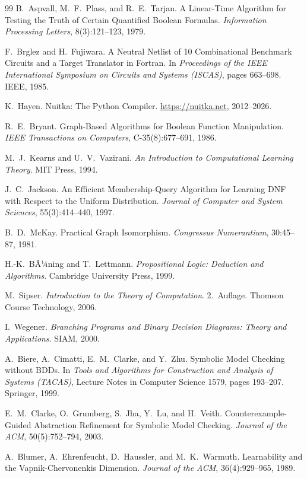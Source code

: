 ﻿\documentclass[a4paper,12pt]{article}
\theoremstyle{definition}
\begin{document}
\begin{thebibliography}{99}
B.\ Aspvall, M.\ F.\ Plass, and R.\ E.\ Tarjan. A Linear-Time Algorithm for Testing the Truth of Certain Quantified Boolean Formulas. \textit{Information Processing Letters}, 8(3):121--123, 1979.

F.\ Brglez and H.\ Fujiwara. A Neutral Netlist of 10 Combinational Benchmark Circuits and a Target Translator in Fortran. In \textit{Proceedings of the IEEE International Symposium on Circuits and Systems (ISCAS)}, pages 663--698. IEEE, 1985.

K.\ Hayen. Nuitka: The Python Compiler. \url{https://nuitka.net}, 2012--2026.

R.\ E.\ Bryant. Graph-Based Algorithms for Boolean Function Manipulation. \textit{IEEE Transactions on Computers}, C-35(8):677--691, 1986.

M.\ J.\ Kearns and U.\ V.\ Vazirani. \textit{An Introduction to Computational Learning Theory}. MIT Press, 1994.

J.\ C.\ Jackson. An Efficient Membership-Query Algorithm for Learning DNF with Respect to the Uniform Distribution. \textit{Journal of Computer and System Sciences}, 55(3):414--440, 1997.

B.\ D.\ McKay. Practical Graph Isomorphism. \textit{Congressus Numerantium}, 30:45--87, 1981.

H.-K.\ BÃ¼ning and T.\ Lettmann. \textit{Propositional Logic: Deduction and Algorithms}. Cambridge University Press, 1999.

M.\ Sipser. \textit{Introduction to the Theory of Computation}. 2.\ Auflage. Thomson Course Technology, 2006.

I.\ Wegener. \textit{Branching Programs and Binary Decision Diagrams: Theory and Applications}. SIAM, 2000.

A.\ Biere, A.\ Cimatti, E.\ M.\ Clarke, and Y.\ Zhu. Symbolic Model Checking without BDDs. In \textit{Tools and Algorithms for Construction and Analysis of Systems (TACAS)}, Lecture Notes in Computer Science 1579, pages 193--207. Springer, 1999.

E.\ M.\ Clarke, O.\ Grumberg, S.\ Jha, Y.\ Lu, and H.\ Veith. Counterexample-Guided Abstraction Refinement for Symbolic Model Checking. \textit{Journal of the ACM}, 50(5):752--794, 2003.

A.\ Blumer, A.\ Ehrenfeucht, D.\ Haussler, and M.\ K.\ Warmuth. Learnability and the Vapnik-Chervonenkis Dimension. \textit{Journal of the ACM}, 36(4):929--965, 1989.

\end{thebibliography}
\end{document}
